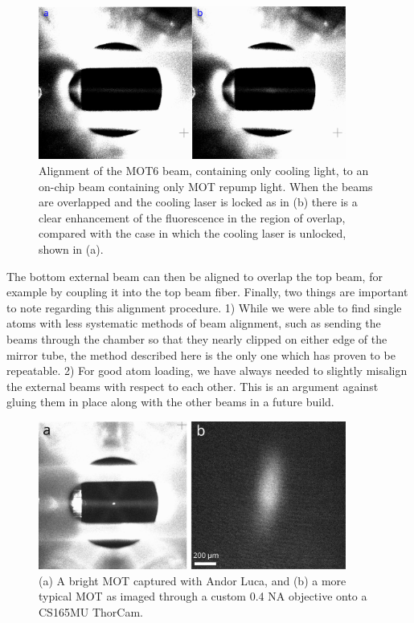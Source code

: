 \begin{figure}[!ht]
    \centering
    \includegraphics[width=0.9\textwidth]{Images/mot6_alignment_to_repump.pdf}
    \caption{Alignment of the MOT6 beam, containing only cooling 
    light, to an on-chip beam containing only MOT repump light. When the 
    beams are overlapped and the cooling laser is locked as in (b) there is a clear enhancement of the fluorescence in the region of overlap, compared with the case in which the cooling laser is unlocked, shown in (a).}
    \label{fig:external_beam_alignment}
\end{figure}
The bottom external beam can then be aligned to overlap the top beam, for example by coupling it into the top beam fiber. Finally, two things are important to note regarding this alignment procedure. 1) While we were able to find single atoms with less systematic methods of beam alignment, such as sending the beams through the chamber so that they nearly clipped on either edge of the mirror tube, the method described here is the only one which has proven to be repeatable. 2) For good atom loading, we have always needed to slightly misalign the external beams with respect to each other. This is an argument against gluing them in place along with the other beams in a future build.
\begin{figure}[!ht]
    \centering
    \includegraphics[width=0.9\textwidth]{Images/large_mot_and_thorcam_mot.pdf}
    \caption{(a) A bright MOT captured with Andor Luca, and (b) a more typical MOT 
    as imaged through a custom 0.4 NA objective onto a 
    CS165MU ThorCam.}
    \label{fig:large_mot_and_thorcam_mot}
\end{figure}
